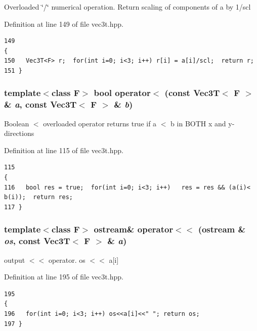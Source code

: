 Overloaded \char`\"{}/\char`\"{} numerical operation. Return scaling of components of a by 1/scl 

Definition at line 149 of file vec3t.hpp.

\footnotesize\begin{verbatim}149                                                                         {
150   Vec3T<F> r;  for(int i=0; i<3; i++) r[i] = a[i]/scl;  return r;
151 }
\end{verbatim}\normalsize 


\subsubsection{\setlength{\rightskip}{0pt plus 5cm}template$<$class F$>$ bool operator$<$ (const {\bf Vec3T}$<$ F $>$ \& {\em a}, const {\bf Vec3T}$<$ F $>$ \& {\em b})\hspace{0.3cm}{\tt  [inline]}}\label{vec3t_8hpp_9a065d11b446f59a52c55d7e27ea46e6_9a065d11b446f59a52c55d7e27ea46e6}


Boolean $<$ overloaded operator returns true if a $<$ b in BOTH x and y-directions 

Definition at line 115 of file vec3t.hpp.

\footnotesize\begin{verbatim}115                                                                                 {
116   bool res = true;  for(int i=0; i<3; i++)   res = res && (a(i)< b(i));  return res; 
117 }
\end{verbatim}\normalsize 


\subsubsection{\setlength{\rightskip}{0pt plus 5cm}template$<$class F$>$ ostream\& operator$<$$<$ (ostream \& {\em os}, const {\bf Vec3T}$<$ F $>$ \& {\em a})}\label{vec3t_8hpp_dc0f5c17b08e3b53a03325a1a70849ad_dc0f5c17b08e3b53a03325a1a70849ad}


output $<$$<$ operator. os $<$$<$ a[i] 

Definition at line 195 of file vec3t.hpp.

\footnotesize\begin{verbatim}195                                                                        { 
196   for(int i=0; i<3; i++) os<<a[i]<<" "; return os;
197 }
\end{verbatim}\normalsize 


